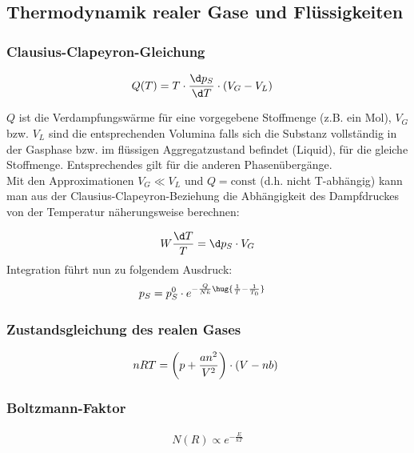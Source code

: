 \documentclass[11pt,letterpaper]{article}
\begin{document}
\subsection{Thermodynamik realer Gase und Flüssigkeiten}
{
    \subsubsection{Clausius-Clapeyron-Gleichung}
    {
        \begin{align*}
            Q(T) &= T\cdot \frac{\d p_S}{\d T} \cdot (V_G - V_L)
        \end{align*}

        $Q$ ist die Verdampfungswärme für eine vorgegebene Stoffmenge (z.B. ein Mol), $V_G$
        bzw. $V_L$ sind die entsprechenden Volumina falls sich die Substanz vollständig in
        der Gasphase bzw. im flüssigen Aggregatzustand befindet (Liquid), für die gleiche
        Stoffmenge. Entsprechendes gilt für die anderen Phasenübergänge.\\

        Mit den Approximationen $V_G \ll V_L$ und $Q = \mathrm{const}$ (d.h. nicht T-abhängig) kann
        man aus der Clausius-Clapeyron-Beziehung die Abhängigkeit des Dampfdruckes
        von der Temperatur näherungsweise berechnen:

        \begin{align*}
            W \frac{\d T}{T} = \d p_S \cdot V_G
        \end{align*}
        Integration führt nun zu folgendem Ausdruck: 
        \begin{align*}
            p_S &= p_S^0 \cdot e ^{-\frac{Q}{Nk}\hug{\frac{1}{T}-\frac{1}{T_0}}}
        \end{align*}
    }
    \subsubsection{Zustandsgleichung des realen Gases}
    {
        \begin{equation*}
            n R T = \left(p+\frac{a n^2}{V^2}\right) \cdot(V-n b)\\\
        \end{equation*}
    }
    \subsubsection{Boltzmann-Faktor}
    {
        \begin{align*}
            N(R) \propto  e^{-\frac{E}{kT}}
        \end{align*}
    }
}
\end{document}
